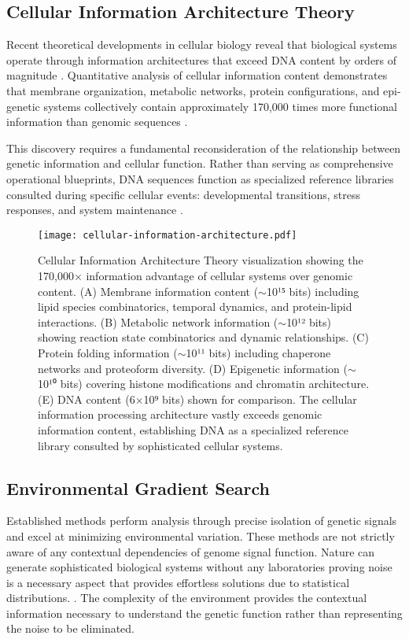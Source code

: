 \documentclass[12pt,a4paper]{article}
\begin{document}
\subsection{Cellular Information Architecture Theory}

Recent theoretical developments in cellular biology reveal that biological systems operate through information architectures that exceed DNA content by orders of magnitude \cite{shannon1948mathematical, cover2006elements}. Quantitative analysis of cellular information content demonstrates that membrane organization, metabolic networks, protein configurations, and epi-genetic systems collectively contain approximately 170,000 times more functional information than genomic sequences \cite{nelson2017lehninger, stryer2015biochemistry}.

This discovery requires a fundamental reconsideration of the relationship between genetic information and cellular function. Rather than serving as comprehensive operational blueprints, DNA sequences function as specialized reference libraries consulted during specific cellular events: developmental transitions, stress responses, and system maintenance \cite{encode2012integrated, venter2001sequence}.

\begin{figure}[H]
\centering
\texttt{[image: cellular-information-architecture.pdf]}
\caption{Cellular Information Architecture Theory visualization showing the 170,000× information advantage of cellular systems over genomic content. (A) Membrane information content ($\sim$10¹⁵ bits) including lipid species combinatorics, temporal dynamics, and protein-lipid interactions. (B) Metabolic network information ($\sim$10¹² bits) showing reaction state combinatorics and dynamic relationships. (C) Protein folding information ($\sim$10¹¹ bits) including chaperone networks and proteoform diversity. (D) Epigenetic information ($\sim$10¹⁰ bits) covering histone modifications and chromatin architecture. (E) DNA content (6×10⁹ bits) shown for comparison. The cellular information processing architecture vastly exceeds genomic information content, establishing DNA as a specialized reference library consulted by sophisticated cellular systems.}
\label{fig:cellular-information-architecture}
\end{figure}



\subsection{Environmental Gradient Search}
Established methods perform analysis through precise isolation of genetic signals and excel at minimizing environmental variation. These methods are not strictly aware of any contextual dependencies of genome signal function. Nature can generate sophisticated biological systems without any laboratories proving noise is a necessary aspect that provides effortless solutions due to statistical distributions.
\cite{fiehn2002metabolomics, patti2012innovation}. The complexity of the environment provides the contextual information necessary to understand the genetic function rather than representing the noise to be eliminated.
\end{document}
